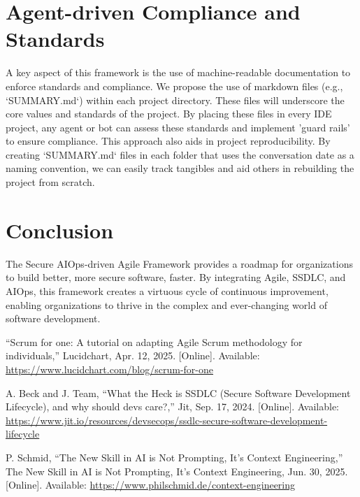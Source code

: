 \documentclass[journal]{IEEEtran}
\begin{document}
\section{Agent-driven Compliance and Standards}
A key aspect of this framework is the use of machine-readable documentation to enforce standards and compliance. We propose the use of markdown files (e.g., `SUMMARY.md`) within each project directory. These files will underscore the core values and standards of the project. By placing these files in every IDE project, any agent or bot can assess these standards and implement 'guard rails' to ensure compliance. This approach also aids in project reproducibility. By creating `SUMMARY.md` files in each folder that uses the conversation date as a naming convention, we can easily track tangibles and aid others in rebuilding the project from scratch.

\section{Conclusion}
The Secure AIOps-driven Agile Framework provides a roadmap for organizations to build better, more secure software, faster. By integrating Agile, SSDLC, and AIOps, this framework creates a virtuous cycle of continuous improvement, enabling organizations to thrive in the complex and ever-changing world of software development.

\begin{thebibliography}{00}

“Scrum for one: A tutorial on adapting Agile Scrum methodology for individuals,” Lucidchart, Apr. 12, 2025. [Online]. Available: \url{https://www.lucidchart.com/blog/scrum-for-one}

A. Beck and J. Team, “What the Heck is SSDLC (Secure Software Development Lifecycle), and why should devs care?,” Jit, Sep. 17, 2024. [Online]. Available: \url{https://www.jit.io/resources/devsecops/ssdlc-secure-software-development-lifecycle}

P. Schmid, “The New Skill in AI is Not Prompting, It’s Context Engineering,” The New Skill in AI is Not Prompting, It’s Context Engineering, Jun. 30, 2025. [Online]. Available: \url{https://www.philschmid.de/context-engineering}

\end{thebibliography}
\end{document}
